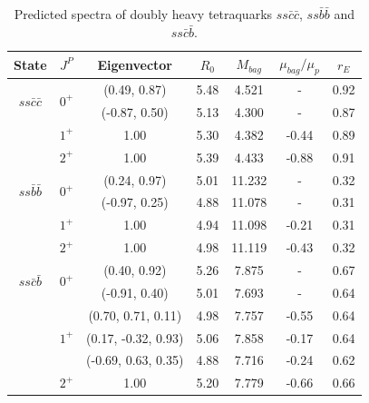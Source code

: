 \documentclass[prd,twocolumn,floatfix,nofootinbib]{revtex4}
\begin{document}
\renewcommand{\tabcolsep}{0.84cm}
\renewcommand{\arraystretch}{1.2}
\begin{table}[!htbp]
    \caption{Predicted spectra of doubly heavy tetraquarks $ss\bar{c}\bar{c}$, $ss\bar{b}\bar{b}$ and $ss\bar{c}\bar{b}$.}
    \label{tab:2heavytetraquark0}
    \begin{tabular}{ccccccc}
        \hline\hline
        {\rm State}     &$J^{P}$    &{\rm Eigenvector}      &$R_{0}$    &$M_{bag}$  &$\mu_{bag}/\mu_{p}$    &$r_{E}$ \\ \hline
        \multirow{2}{*}{$ss\bar{c}\bar{c}$}
                        &\multirow{2}{*}{$0^{+}$}
                                    &(0.49, 0.87)           &5.48	    &4.521	    &-                      &0.92 \\ 
                        &           &(-0.87, 0.50)          &5.13	    &4.300	    &-                      &0.87 \\ 
                        &$1^{+}$    &1.00                   &5.30	    &4.382	    &-0.44                  &0.89 \\ 
                        &$2^{+}$    &1.00                   &5.39	    &4.433	    &-0.88                  &0.91 \\ 
        \multirow{2}{*}{$ss\bar{b}\bar{b}$}
                        &\multirow{2}{*}{$0^{+}$}
                                    &(0.24, 0.97)           &5.01	    &11.232	    &-                      &0.32 \\ 
                        &           &(-0.97, 0.25)          &4.88	    &11.078	    &-                      &0.31 \\ 
                        &$1^{+}$    &1.00                   &4.94	    &11.098	    &-0.21                  &0.31 \\ 
                        &$2^{+}$    &1.00                   &4.98	    &11.119	    &-0.43                  &0.32 \\ 
        \multirow{2}{*}{$ss\bar{c}\bar{b}$}
                        &\multirow{2}{*}{$0^{+}$}
                                    &(0.40, 0.92)           &5.26	    &7.875	    &-                      &0.67 \\ 
                        &           &(-0.91, 0.40)          &5.01	    &7.693	    &-                      &0.64 \\ 
                        &\multirow{3}{*}{$1^{+}$}
                                    &(0.70, 0.71, 0.11)     &4.98	    &7.757	    &-0.55                  &0.64 \\ 
                        &           &(0.17, -0.32, 0.93)    &5.06	    &7.858	    &-0.17                  &0.64 \\ 
                        &           &(-0.69, 0.63, 0.35)    &4.88	    &7.716	    &-0.24                  &0.62 \\ 
                        &$2^{+}$    &1.00                   &5.20	    &7.779	    &-0.66                  &0.66 \\ 
        \hline\hline
    \end{tabular}
\end{table}
\end{document}
